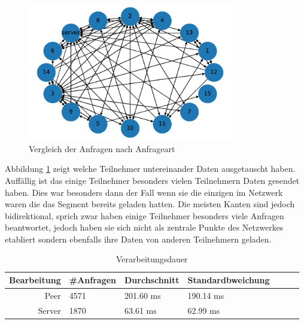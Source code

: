 \begin{figure}[!h]
	\centering
	\includegraphics[width=0.8\textwidth]{figures/15_clients_network}
	\caption[A Figure Short-Title]{Vergleich der Anfragen nach Anfrageart}
	\label{fig:15_clients_network}
\end{figure}

Abbildung \ref{fig:15_clients_network} zeigt welche Teilnehmer untereinander Daten ausgetauscht haben. Auffällig ist das einige Teilnehmer besonders vielen Teilnehmern Daten gesendet haben. Dies war besonders dann der Fall wenn sie die einzigen im Netzwerk waren die das Segment bereits geladen hatten. Die meisten Kanten sind jedoch bidirektional, sprich zwar haben einige Teilnehmer besonders viele Anfragen beantwortet, jedoch haben sie sich nicht als zentrale Punkte des Netzwerkes etabliert sondern ebenfalls ihre Daten von anderen Teilnehmern geladen.  

\begin{table}[!htb]
\begin{center}

	\begin{tabular}{|r|l|l|l|l|l|l|}
		\hline
		Bearbeitung	 & #Anfragen 	& Durchschnitt 	& Standardbweichung \\ \hline %
		Peer 		& 4571 				& 201.60	 ms	  	& 190.14	 ms	\\ \hline %
		Server 		& 1870		 		& 63.61 ms		& 62.99	ms	\\ %
		\hline
	\end{tabular}
	\caption{Verarbeitungsdauer}
\end{center}

\end{table}


